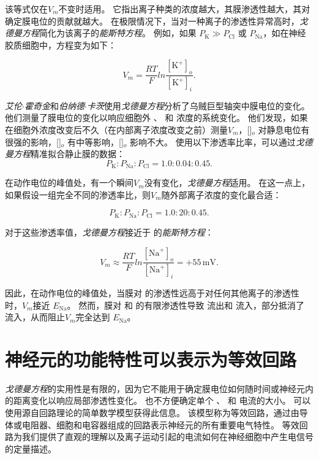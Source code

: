 该等式仅在$V_m$不变时适用。
它指出离子种类的浓度越大，其膜渗透性越大，其对确定膜电位的贡献就越大。
在极限情况下，当对一种离子的渗透性异常高时，\textit{戈德曼方程}简化为该离子的\textit{能斯特方程}。 
例如，如果 $P_\text{K} \gg P_\text{Cl}$ 或 $P_\text{Na}$，如在神经胶质细胞中，方程变为如下：

\begin{equation} \label{eq:9_glial_cell_equation}
	V_m = \frac{RT}{F}
		ln \frac{[\text{K}^+]_o}{[\text{K}^+]_i}.
\end{equation}


\textit{艾伦$\cdot$霍奇金}和\textit{伯纳德$\cdot$卡茨}使用\textit{戈德曼方程}分析了乌贼巨型轴突中膜电位的变化。
他们测量了膜电位的变化以响应细胞外 、 和  浓度的系统变化。
他们发现，如果在细胞外浓度改变后不久（在内部离子浓度改变之前）测量$V_m$，[]$_o$ 对静息电位有很强的影响，[]$_o$ 有中等影响，[]$_o$ 影响不大。 
使用以下渗透率比率，可以通过\textit{戈德曼方程}精准拟合静止膜的数据：
\begin{equation}
	P_\text{K} : P_\text{Na} : P_\text{Cl} = 1.0 : 0.04 : 0.45.
\end{equation}

在动作电位的峰值处，有一个瞬间$V_m$没有变化，\textit{戈德曼方程}适用。 
在这一点上，如果假设一组完全不同的渗透率比，则$V_m$随外部离子浓度的变化最合适：

\begin{equation}
	P_\text{K} : P_\text{Na} : P_\text{Cl} = 1.0 : 20 : 0.45.
\end{equation}


对于这些渗透率值，\textit{戈德曼方程}接近于  的\textit{能斯特方程}：

\begin{equation}
	V_m \approx \frac{RT}{F} 
			ln \frac{[\text{Na}^+]_o}{[\text{Na}^+]_i} =
			+ 55 \, \text{mV}.
\end{equation}


因此，在动作电位的峰值处，当膜对  的渗透性远高于对任何其他离子的渗透性时，$V_m$接近 $E_\text{Na}$。 
然而，膜对  和  的有限渗透性导致  流出和  流入，部分抵消了  流入，从而阻止$V_m$完全达到 $E_\text{Na}$。



\section{神经元的功能特性可以表示为等效回路}

\textit{戈德曼方程}的实用性是有限的，因为它不能用于确定膜电位如何随时间或神经元内的距离变化以响应局部渗透性变化。
也不方便确定单个 、 和  电流的大小。
可以使用源自回路理论的简单数学模型获得此信息。
该模型称为等效回路，通过由导体或电阻器、细胞和电容器组成的回路表示神经元的所有重要电气特性。
等效回路为我们提供了直观的理解以及离子运动引起的电流如何在神经细胞中产生电信号的定量描述。


